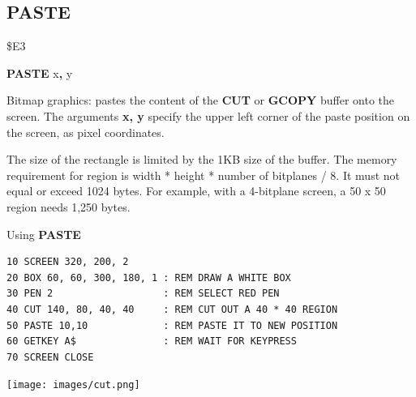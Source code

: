 \subsection{PASTE}
\begin{description}[leftmargin=2cm,style=nextline]
\item [Token:]    \$E3

\item [Format:]   {\bf PASTE} x{\bf,} y

\item [Usage:]    Bitmap graphics: pastes the content of the {\bf CUT} or {\bf GCOPY} buffer onto the screen. The arguments {\bf x, y} specify the upper left corner of the paste position on the screen, as pixel coordinates.

\item [Remarks:]  The size of the rectangle is limited by the 1KB size of the buffer. The memory requirement for region is width * height * number of bitplanes / 8. It must not equal or exceed 1024 bytes. For example, with a 4-bitplane screen, a 50 x 50 region needs 1,250 bytes.

\item [Example:]  Using {\bf PASTE}

\begin{tcolorbox}[colback=black,coltext=white]
\verbatimfont{\codefont}
\begin{verbatim}
10 SCREEN 320, 200, 2
20 BOX 60, 60, 300, 180, 1 : REM DRAW A WHITE BOX
30 PEN 2                   : REM SELECT RED PEN
40 CUT 140, 80, 40, 40     : REM CUT OUT A 40 * 40 REGION
50 PASTE 10,10             : REM PASTE IT TO NEW POSITION
60 GETKEY A$               : REM WAIT FOR KEYPRESS
70 SCREEN CLOSE
\end{verbatim}
\end{tcolorbox}

\item \begin{center}\texttt{[image: images/cut.png]}\end{center}

\end{description}


\newpage
